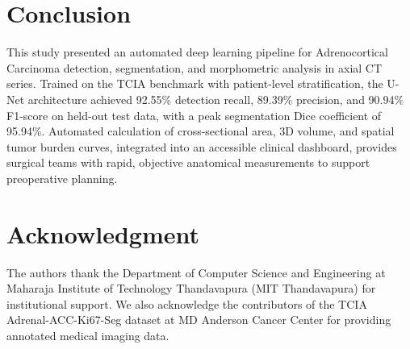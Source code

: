 \documentclass[conference]{IEEEtran}
\begin{document}
\section{Conclusion}
This study presented an automated deep learning pipeline for Adrenocortical Carcinoma detection, segmentation, and morphometric analysis in axial CT series. Trained on the TCIA benchmark with patient-level stratification, the U-Net architecture achieved 92.55\% detection recall, 89.39\% precision, and 90.94\% F1-score on held-out test data, with a peak segmentation Dice coefficient of 95.94\%. Automated calculation of cross-sectional area, 3D volume, and spatial tumor burden curves, integrated into an accessible clinical dashboard, provides surgical teams with rapid, objective anatomical measurements to support preoperative planning.

\section*{Acknowledgment}
The authors thank the Department of Computer Science and Engineering at Maharaja Institute of Technology Thandavapura (MIT Thandavapura) for institutional support. We also acknowledge the contributors of the TCIA Adrenal-ACC-Ki67-Seg dataset at MD Anderson Cancer Center for providing annotated medical imaging data.
\end{document}
